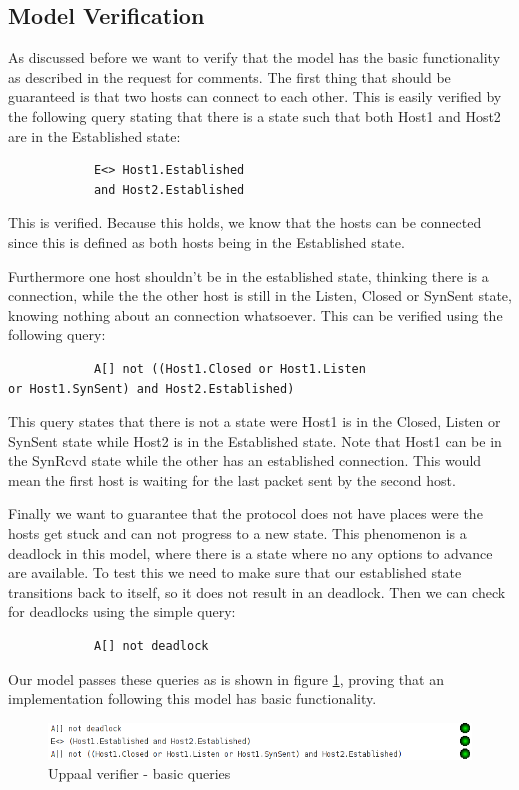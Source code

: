 \documentclass[twocolumn]{article}
\begin{document}
	\subsection{Model Verification} %
	\label{sub:model_verification}
		As discussed before we want to verify that the model has the basic functionality as described in the request for comments. The first thing that should be guaranteed is that two hosts can connect to each other. This is easily verified by the following query stating that there is a state such that both Host1 and Host2 are in the Established state:
		\begin{verbatim}
			E<> Host1.Established 
			and Host2.Established
		\end{verbatim}
		This is verified. Because this holds, we know that the hosts can be connected since this is defined as both hosts being in the Established state.

		Furthermore one host shouldn't be in the established state, thinking there is a connection, while the the other host is still in the Listen, Closed or SynSent state, knowing nothing about an connection whatsoever. This can be verified using the following query:
		\begin{verbatim}
			A[] not ((Host1.Closed or Host1.Listen 
or Host1.SynSent) and Host2.Established)
		\end{verbatim}
		This query states that there is not a state were Host1 is in the Closed, Listen or SynSent state while Host2 is in the Established state. Note that Host1 can be in the SynRcvd state while the other has an established connection. This would mean the first host is waiting for the last packet sent by the second host.

		Finally we want to guarantee that the protocol does not have places were the hosts get stuck and can not progress to a new state. This phenomenon is a deadlock in this model, where there is a state where no any options to advance are available. To test this we need to make sure that our established state transitions back to itself, so it does not result in an deadlock. Then we can check for deadlocks using the simple query:
		\begin{verbatim}
			A[] not deadlock
		\end{verbatim}

		Our model passes these queries as is shown in figure \ref{fig:verifier}, proving that an implementation following this model has basic functionality.
		\begin{figure}[h!]
			\begin{center}
				\includegraphics[width=\linewidth]{verifier.png}
			\end{center}
			\caption{Uppaal verifier - basic queries}
			\label{fig:verifier}
		\end{figure}
\end{document}
